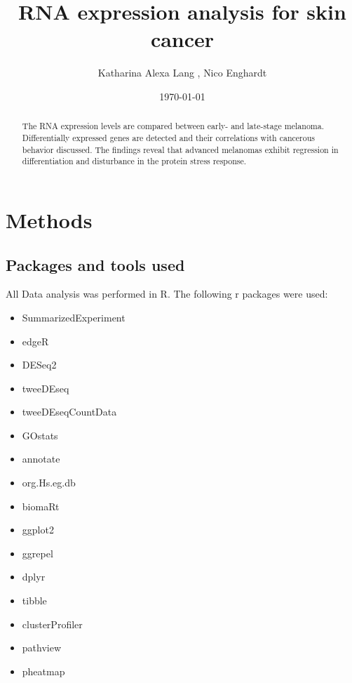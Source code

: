 \documentclass[twoside]{article}
\title{RNA expression analysis for skin cancer}
\date{\today}
\author{Katharina Alexa Lang , Nico Enghardt}
\begin{document}
\pagestyle{fancy}
\maketitle

\begin{abstract}
The RNA expression levels are compared between early- and late-stage melanoma. Differentially expressed genes are detected and their correlations with cancerous behavior discussed. The findings reveal that advanced melanomas exhibit regression in differentiation and disturbance in the protein stress response. \end{abstract}
\tableofcontents

\newpage
\section{Methods}
\subsection{Packages and tools used}
All Data analysis was performed in R. The following r packages were used: 
\begin{multicols}{2}
\begin{itemize}
\item SummarizedExperiment
\item edgeR
\item DESeq2
\item tweeDEseq
\item tweeDEseqCountData
\item GOstats
\item annotate
\item org.Hs.eg.db
\item biomaRt
\item ggplot2
\item ggrepel
\item dplyr
\item tibble
\item clusterProfiler
\item pathview
\item pheatmap
\end{itemize}
\end{multicols}
\end{document}
